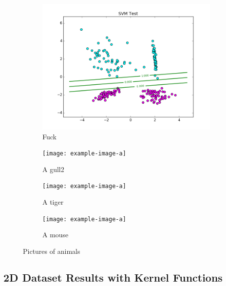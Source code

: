 \documentclass[a4paper,twoside]{article}
\begin{document}
\begin{figure}
        \begin{subfigure}[b]{0.25\textwidth}
                \includegraphics[width=\linewidth]{Figures/P2/svm_data1_test_C1.png}
                \caption{Fuck}
                \label{fig:gull}
        \end{subfigure}%
        \begin{subfigure}[b]{0.25\textwidth}
                \texttt{[image: example-image-a]}
                \caption{A gull2}
                \label{fig:gull2}
        \end{subfigure}%
        \begin{subfigure}[b]{0.25\textwidth}
                \texttt{[image: example-image-a]}
                \caption{A tiger}
                \label{fig:tiger}
        \end{subfigure}%
        \begin{subfigure}[b]{0.25\textwidth}
                \texttt{[image: example-image-a]}
                \caption{A mouse}
                \label{fig:mouse}
        \end{subfigure}
        \caption{Pictures of animals}\label{fig:animals}
\end{figure}


\subsection{2D Dataset Results with Kernel Functions}



\end{document}
